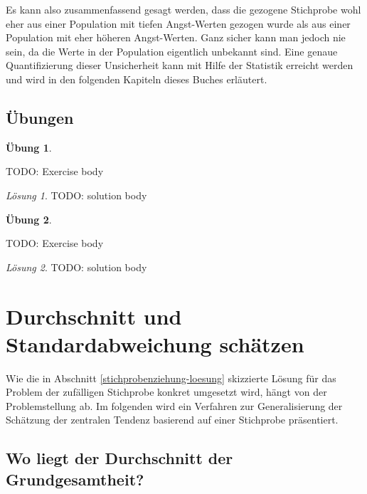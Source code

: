 \documentclass[
]{book}
\theoremstyle{definition}
\theoremstyle{definition}
\theoremstyle{definition}
\newtheorem{exercise}{Übung}[chapter]
\theoremstyle{definition}
\theoremstyle{remark}
\newtheorem*{solution}{Lösung}
\begin{document}
Es kann also zusammenfassend gesagt werden, dass die gezogene Stichprobe wohl eher aus einer Population mit tiefen Angst-Werten gezogen wurde als aus einer Population mit eher höheren Angst-Werten. Ganz sicher kann man jedoch nie sein, da die Werte in der Population eigentlich unbekannt sind. Eine genaue Quantifizierung dieser Unsicherheit kann mit Hilfe der Statistik erreicht werden und wird in den folgenden Kapiteln dieses Buches erläutert.

\section{Übungen}\label{uxfcbungen}

\begin{exercise}
\protect\hypertarget{exr:tagname_alskfdieu}{}\label{exr:tagname_alskfdieu}\leavevmode

TODO: Exercise body

\end{exercise}

\begin{solution}
TODO: solution body
\end{solution}

\begin{exercise}
\protect\hypertarget{exr:tagname_apwioev}{}\label{exr:tagname_apwioev}\leavevmode

TODO: Exercise body

\end{exercise}

\begin{solution}
TODO: solution body
\end{solution}

\chapter{Durchschnitt und Standardabweichung schätzen}\label{durchschnitt-und-standardabweichung-schuxe4tzen}

Wie die in Abschnitt \ref{stichprobenziehung-loesung} skizzierte Lösung für das Problem der zufälligen Stichprobe konkret umgesetzt wird, hängt von der Problemstellung ab. Im folgenden wird ein Verfahren zur Generalisierung der Schätzung der zentralen Tendenz
basierend auf einer Stichprobe präsentiert.

\section{Wo liegt der Durchschnitt der Grundgesamtheit?}\label{wo-liegt-der-durchschnitt-der-grundgesamtheit}
\end{document}

